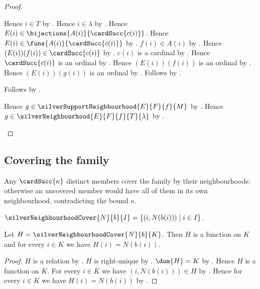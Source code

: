 \begin{proof}
\begin{byCase}
\begin{subproof}
\begin{subproof}
                    Hence $i\in T$ by .
                    Hence $i\in\lambda$ by .
                    Hence $E(i)\in\bijections{A(i)}{\cardSucc{c(i)}}$.
                    Hence $E(i)\in\funs{A(i)}{\cardSucc{c(i)}}$
                        by .
                    $f(i)\in A(i)$ by .
                    Hence $(E(i))(f(i))\in\cardSucc{c(i)}$
                        by .
                    $c(i)$ is a cardinal
                        by .
                    Hence $\cardSucc{c(i)}$ is an ordinal
                        by .
                    Hence $(E(i))(f(i))$ is an ordinal
                        by .
                    Hence $(E(i))(g(i))$ is an ordinal
                        by .
                    Follows by .
                \end{subproof}
                Follows by .
            \end{subproof}
            Hence $g\in\silverSupportNeighbourhood{E}{F}{f}{M}$
                by .
            Hence $g\in\silverNeighbourhood{E}{F}{f}{T}{\lambda}$
                by .
    \end{byCase}
\end{proof}

\subsection{Covering the family}

Any $\cardSucc{\kappa}$ distinct members cover the family by their
neighbourhoods: otherwise an uncovered member would have all of them in
its own neighbourhood, contradicting the bound $\kappa$.

\begin{definition}\label{silver_neighbourhood_cover}
    $\silverNeighbourhoodCover{N}{b}{I}
        =\{(i,N(b(i)))\mid i\in I\}$.
\end{definition}

\begin{proposition}\label{silver_neighbourhood_cover_type}
    Let $H=\silverNeighbourhoodCover{N}{b}{K}$.
    Then $H$ is a function on $K$ and
        for every $i\in K$ we have $H(i)=N(b(i))$.
\end{proposition}
\begin{proof}
    $H$ is a relation
        by .
    $H$ is right-unique by
        .
    $\dom{H}=K$ by
        .
    Hence $H$ is a function on $K$.
    For every $i\in K$ we have $(i,N(b(i)))\in H$
        by .
    Hence for every $i\in K$ we have $H(i)=N(b(i))$
        by .
\end{proof}

